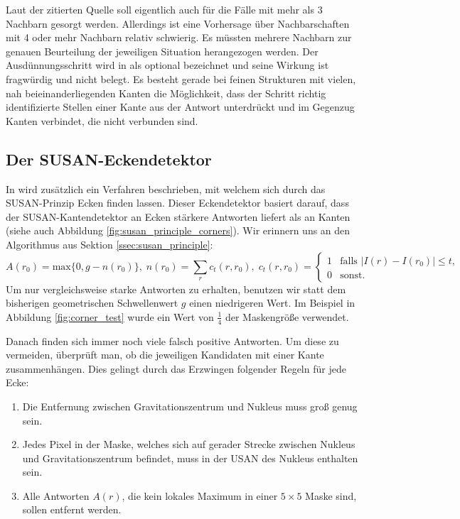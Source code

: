 \documentclass[a4paper, 11pt]{report}
\theoremstyle{definition}
\begin{document}
			Laut der zitierten Quelle \cite{thinout} soll eigentlich auch für die Fälle mit mehr als 3 Nachbarn gesorgt werden. Allerdings ist eine Vorhersage über Nachbarschaften mit 4 oder mehr Nachbarn relativ schwierig. Es müssten mehrere Nachbarn zur genauen Beurteilung der jeweiligen Situation herangezogen werden.
			Der Ausdünnungsschritt wird in \cite{SUSAN} als optional bezeichnet und seine Wirkung ist fragwürdig und nicht belegt. Es besteht gerade bei feinen Strukturen mit vielen, nah beieinanderliegenden Kanten die Möglichkeit, dass der Schritt richtig identifizierte Stellen einer Kante aus der Antwort unterdrückt und im Gegenzug Kanten verbindet, die nicht verbunden sind.

		\subsection{Der SUSAN-Eckendetektor}\label{ssec:corner_detector}
			In \cite{SUSAN} wird zusätzlich ein Verfahren beschrieben, mit welchem sich durch das SUSAN-Prinzip Ecken finden lassen. Dieser Eckendetektor basiert darauf, dass der SUSAN-Kantendetektor an Ecken stärkere Antworten liefert als an Kanten (siehe auch Abbildung \ref{fig:susan_principle_corners}).
			Wir erinnern uns an den Algorithmus aus Sektion \ref{ssec:susan_principle}:
			$$
				A(r_0) = \text{max}\{0, g - n(r_0)\},\;
				n(r_0) = \sum_r c_t(r, r_0),\;
				c_t(r, r_0) =
					\begin{cases}
						1 	& \text{falls } |I(r) - I(r_0)| \leq t, 	\\
						0 	& \text{sonst.}
					\end{cases}
			$$
			Um nur vergleichsweise starke Antworten zu erhalten, benutzen wir statt dem bisherigen geometrischen Schwellenwert $g$ einen niedrigeren Wert. Im Beispiel in Abbildung \ref{fig:corner_test} wurde ein Wert von $\frac{1}{4}$ der Maskengröße verwendet.

			Danach finden sich immer noch viele falsch positive Antworten. Um diese zu vermeiden, überprüft man, ob die jeweiligen Kandidaten mit einer Kante zusammenhängen. Dies gelingt durch das Erzwingen folgender Regeln für jede Ecke:

			\begin{enumerate}
				\item Die Entfernung zwischen Gravitationszentrum und Nukleus muss groß genug sein.
				\item Jedes Pixel in der Maske, welches sich auf gerader Strecke zwischen Nukleus und Gravitationszentrum befindet, muss in der USAN des Nukleus enthalten sein.
				\item Alle Antworten $A(r)$, die kein lokales Maximum in einer $5\times 5$ Maske sind, sollen entfernt werden.
			\end{enumerate}
\end{document}
